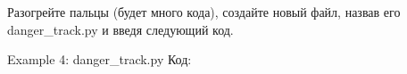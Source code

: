 \documentclass[12pt, a4paper, oneside]{book}
\begin{document}
Разогрейте пальцы (будет много кода), создайте новый файл, назвав его danger\_track.py и введя следующий код.

Example 4: danger\_track.py
Код:













\end{document}
